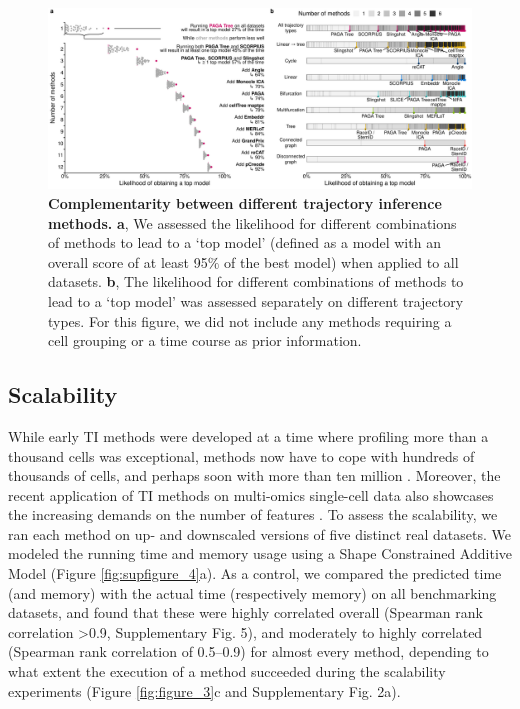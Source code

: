 \begin{figure}[htb!]
	\centering\includegraphics[width=\linewidth]{fig/figure_4.pdf}
	\caption{
		\textbf{Complementarity between different trajectory inference methods.}
		\textbf{a}, We assessed the likelihood for different combinations of methods to lead to a ‘top model’ (defined as a model with an overall score of at least 95$\%$ of the best model) when applied to all datasets. \textbf{b}, The likelihood for different combinations of methods to lead to a ‘top model’ was assessed separately on different trajectory types. For this figure, we did not include any methods requiring a cell grouping or a time course as prior information.
	}
	\label{fig:figure_4}
\end{figure}

\subsection{Scalability}

While early TI methods were developed at a time where profiling more than a thousand cells was exceptional, methods now have to cope with hundreds of thousands of cells, and perhaps soon with more than ten million \cite{svensson_exponentialscalingsinglecell_2018}. Moreover, the recent application of TI methods on multi-omics single-cell data also showcases the increasing demands on the number of features \cite{cao_jointprofilingchromatin_2018}. To assess the scalability, we ran each method on up- and downscaled versions of five distinct real datasets. We modeled the running time and memory usage using a Shape Constrained Additive Model \cite{pya_shapeconstrainedadditive_2015} (Figure \ref{fig:supfigure_4}a). As a control, we compared the predicted time (and memory) with the actual time (respectively memory) on all benchmarking datasets, and found that these were highly correlated overall (Spearman rank correlation >0.9, Supplementary Fig. 5), and moderately to highly correlated (Spearman rank correlation of 0.5–0.9) for almost every method, depending to what extent the execution of a method succeeded during the scalability experiments (Figure \ref{fig:figure_3}c and Supplementary Fig. 2a).

